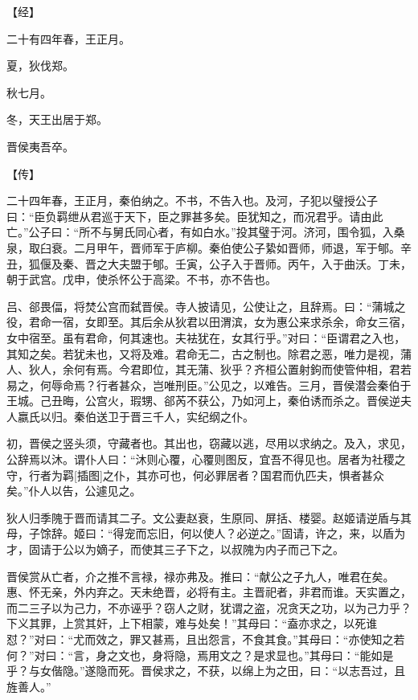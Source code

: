\documentclass[a4paper,12pt,UTF8,twoside]{ctexbook}
\begin{document}
【经】

二十有四年春，王正月。

夏，狄伐郑。

秋七月。

冬，天王出居于郑。

晋侯夷吾卒。

【传】

二十四年春，王正月，秦伯纳之。不书，不告入也。及河，子犯以璧授公子曰：“臣负羁绁从君巡于天下，臣之罪甚多矣。臣犹知之，而况君乎。请由此亡。”公子曰：“所不与舅氏同心者，有如白水。”投其璧于河。济河，围令狐，入桑泉，取臼衰。二月甲午，晋师军于庐柳。秦伯使公子絷如晋师，师退，军于郇。辛丑，狐偃及秦、晋之大夫盟于郇。壬寅，公子入于晋师。丙午，入于曲沃。丁未，朝于武宫。戊申，使杀怀公于高梁。不书，亦不告也。

吕、郤畏偪，将焚公宫而弑晋侯。寺人披请见，公使让之，且辞焉。曰：“蒲城之役，君命一宿，女即至。其后余从狄君以田渭滨，女为惠公来求杀余，命女三宿，女中宿至。虽有君命，何其速也。夫袪犹在，女其行乎。”对曰：“臣谓君之入也，其知之矣。若犹未也，又将及难。君命无二，古之制也。除君之恶，唯力是视，蒲人、狄人，余何有焉。今君即位，其无蒲、狄乎？齐桓公置射鉤而使管仲相，君若易之，何辱命焉？行者甚众，岂唯刑臣。”公见之，以难告。三月，晋侯潜会秦伯于王城。己丑晦，公宫火，瑕甥、郤芮不获公，乃如河上，秦伯诱而杀之。晋侯逆夫人嬴氏以归。秦伯送卫于晋三千人，实纪纲之仆。

初，晋侯之竖头须，守藏者也。其出也，窃藏以逃，尽用以求纳之。及入，求见，公辞焉以沐。谓仆人曰：“沐则心覆，心覆则图反，宜吾不得见也。居者为社稷之守，行者为羁[插图]之仆，其亦可也，何必罪居者？国君而仇匹夫，惧者甚众矣。”仆人以告，公遽见之。

狄人归季隗于晋而请其二子。文公妻赵衰，生原同、屏括、楼婴。赵姬请逆盾与其母，子馀辞。姬曰：“得宠而忘旧，何以使人？必逆之。”固请，许之，来，以盾为才，固请于公以为嫡子，而使其三子下之，以叔隗为内子而己下之。

晋侯赏从亡者，介之推不言禄，禄亦弗及。推曰：“献公之子九人，唯君在矣。惠、怀无亲，外内弃之。天未绝晋，必将有主。主晋祀者，非君而谁。天实置之，而二三子以为己力，不亦诬乎？窃人之财，犹谓之盗，况贪天之功，以为己力乎？下义其罪，上赏其奸，上下相蒙，难与处矣！”其母曰：“盍亦求之，以死谁怼？”对曰：“尤而效之，罪又甚焉，且出怨言，不食其食。”其母曰：“亦使知之若何？”对曰：“言，身之文也，身将隐，焉用文之？是求显也。”其母曰：“能如是乎？与女偕隐。”遂隐而死。晋侯求之，不获，以绵上为之田，曰：“以志吾过，且旌善人。”
\end{document}
